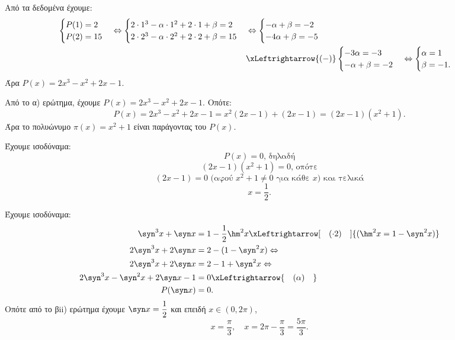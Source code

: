 \documentclass[11pt,a4paper,twoside]{book}
\begin{document}
\begin{alist}
\item Από τα δεδομένα έχουμε:
\begin{align*}
\begin{cases} P(1) = 2 \\ P(2) = 15 \end{cases} \Leftrightarrow \begin{cases} 2\cdot 1^3 - \alpha \cdot 1^2 + 2\cdot 1 + \beta = 2 \\ 2\cdot 2^3 - \alpha \cdot 2^2 + 2\cdot 2 + \beta = 15 \end{cases} &\Leftrightarrow \begin{cases} -\alpha + \beta = -2 \\ -4\alpha + \beta = -5 \end{cases} \\
&\xLeftrightarrow{(-)} \begin{cases} -3\alpha = -3 \\ -\alpha + \beta = -2 \end{cases} \Leftrightarrow \begin{cases} \alpha = 1 \\ \beta = -1. \end{cases}
\end{align*}
Άρα $P(x) = 2x^3 - x^2 + 2x - 1$.
\item 
\begin{rlist}
\item Από το α) ερώτημα, έχουμε $P(x) = 2x^3 - x^2 + 2x - 1$. Οπότε:
\[P(x) = 2x^3 - x^2 + 2x - 1 = x^2(2x-1) + (2x-1) = (2x-1)(x^2+1).\]
Άρα το πολυώνυμο $\pi(x) = x^2+1$ είναι παράγοντας του $P(x)$.
\item Έχουμε ισοδύναμα:
\[P(x) = 0 \text{, δηλαδή}\]
\[(2x-1)(x^2+1) = 0 \text{, οπότε}\]
\[(2x-1) = 0 \text{ (αφού } x^2+1 \ne 0 \text{ για κάθε } x) \text{ και τελικά}\]
\[x = \frac{1}{2}.\]
\end{rlist}
\item Έχουμε ισοδύναμα:
\begin{align*}
\syn ^3x + \syn  x &= 1 - \frac{1}{2}\hm ^2x \xLeftrightarrow[\quad (\cdot 2) \quad]{(\hm ^2x = 1 - \syn ^2x)} \\
2\syn ^3x + 2\syn  x &= 2 - (1 - \syn ^2x) \Leftrightarrow \\
2\syn ^3x + 2\syn  x &= 2 - 1 + \syn ^2x \Leftrightarrow \\
2\syn ^3x - \syn ^2x + 2\syn  x - 1 &= 0 \xLeftrightarrow{\quad (\alpha) \quad} \\
P(\syn  x) &= 0.
\end{align*}
Οπότε από το βii) ερώτημα έχουμε $\syn  x = \dfrac{1}{2}$ και επειδή $x \in (0, 2\pi)$,
\[x = \frac{\pi}{3}, \quad x = 2\pi - \frac{\pi}{3} = \frac{5\pi}{3}.\]
\end{alist}
\end{document}
